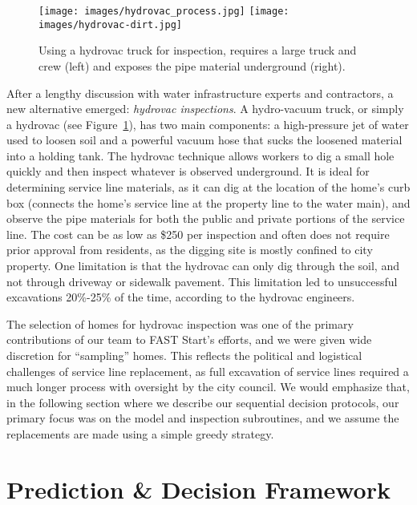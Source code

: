 \documentclass[sigconf]{acmart}
\begin{document}
\begin{figure}[!ht]
\begin{center}
\texttt{[image: images/hydrovac\_process.jpg]}
\texttt{[image: images/hydrovac-dirt.jpg]}
	\caption{Using a hydrovac truck for inspection, requires a large truck and crew (left) and exposes the pipe material underground (right).
  }
	\label{fig:hydrovac}
\end{center}
\end{figure}

After a lengthy discussion with water infrastructure experts and contractors, a new alternative emerged: \emph{hydrovac inspections}. A hydro-vacuum truck, or simply a hydrovac (see Figure~\ref{fig:hydrovac}), has two main components: a high-pressure jet of water used to loosen soil and a powerful vacuum hose that sucks the loosened material into a holding tank. The hydrovac technique allows workers to dig a small hole quickly and then inspect whatever is observed underground. It is ideal for determining service line materials, as it can dig at the location of the home's curb box (connects the home's service line at the property line to the water main), and observe the pipe materials for both the public and private portions of the service line. The cost can be as low as \$250 per inspection and often does not require prior approval from residents, as the digging site is mostly confined to city property. One limitation is that the hydrovac can only dig through the soil, and not through driveway or sidewalk pavement. This limitation led to unsuccessful excavations 20\%-25\% of the time, according to the hydrovac engineers.

The selection of homes for hydrovac inspection was one of the primary contributions of our team to FAST Start's efforts, and we were given wide discretion for ``sampling'' homes. This reflects the political and logistical challenges of service line replacement, as full excavation of service lines required a much longer process with oversight by the city council. We would emphasize that, in the following section where we describe our sequential decision protocols, our primary focus was on the model and inspection subroutines, and we assume the replacements are made using a simple greedy strategy.



\section{Prediction \& Decision Framework}
\label{sec:overall_framework}
\end{document}
